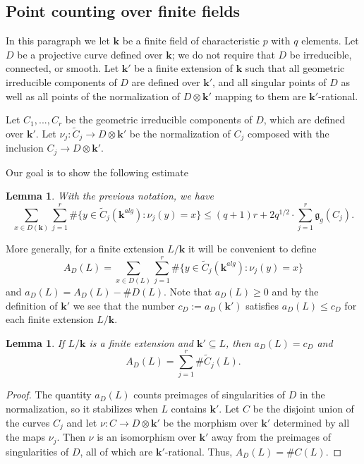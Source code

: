 \documentclass[11pt]{amsart}
\newtheorem{lemma}[theorem]{Lemma}
\theoremstyle{remark}
\numberwithin{equation}{section}
\newcommand{\gfrak}{\mathfrak{g}}
\newcommand{\kk}{\mathbf{k}}
\begin{document}




\subsection{Point counting over finite fields} \label{SecZeta}

In this paragraph we let $\kk$ be a finite field of characteristic $p$ with $q$ elements. Let $D$ be a projective curve defined over $\kk$; we do not require that $D$ be irreducible, connected, or smooth. Let $\kk'$ be a finite extension of $\kk$ such that all geometric irreducible components of $D$ are defined over $\kk'$, and all singular points of $D$ as well as all points of the normalization of $D\otimes \kk'$ mapping to them are $\kk'$-rational.

Let $C_1,...,C_r$ be the geometric irreducible components of $D$, which are defined over $\kk'$. Let $\nu_j:\widetilde{C}_j\to D\otimes \kk'$ be the normalization of $C_j$ composed with the inclusion $C_j\to D\otimes \kk'$. 

Our goal is to show the following estimate

\begin{lemma}\label{LemmaWeilBound} With the previous notation, we have
$$
\sum_{x\in D(\kk)} \sum_{j=1}^r \#\{y\in \widetilde{C}_j(\kk^{alg}) : \nu_j(y)=x\} \le (q+1)r + 2q^{1/2}\cdot \sum_{j=1}^r \gfrak_g(C_j).
$$
\end{lemma}
More generally, for a finite extension $L/\kk$ it will be convenient to define 
$$
A_D(L)=\sum_{x\in D(L)} \sum_{j=1}^r \#\{y\in \widetilde{C}_j(\kk^{alg}) : \nu_j(y)=x\}
$$
and $a_D(L)=A_D(L)-\#D(L)$. Note that $a_D(L)\ge 0$ and by the definition of $\kk'$ we see that the number $c_D:=a_D(\kk')$ satisfies $a_D(L)\le c_D$ for each finite extension $L/\kk$.

\begin{lemma}\label{LemmaLbig} If $L/\kk$ is a finite extension and $\kk'\subseteq L$, then $a_D(L)=c_D$ and
$$
A_D(L)=\sum_{j=1}^r \#\widetilde{C}_j(L).
$$
\end{lemma}
\begin{proof} The quantity $a_D(L)$ counts preimages of singularities of $D$ in the normalization, so it stabilizes when $L$ contains $\kk'$. Let $C$ be the disjoint union of the curves $C_j$ and let $\nu:C\to D\otimes \kk'$ be the morphism over $\kk'$ determined by all the maps $\nu_j$. Then $\nu$ is an isomorphism over $\kk'$ away from the preimages of singularities of $D$, all of which are $\kk'$-rational. Thus,  $A_D(L)=\#C(L)$.
\end{proof}
\end{document}
